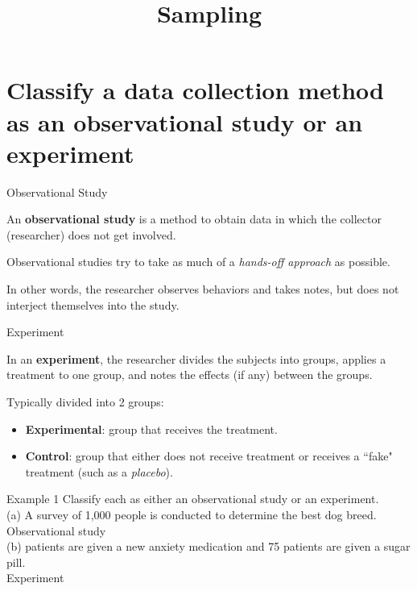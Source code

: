 \documentclass[t]{beamer}
\title{Sampling}
\author{}
\date{}
\begin{document}
\begin{frame} 
\maketitle
\end{frame}

\section{Classify a data collection method as an observational study or an experiment}

\begin{frame}{Observational Study}
\begin{tcolorbox}[colframe=green!20!black, colback = green!30!white,title=\textbf{Observational Study}]
An \textbf{observational study} is a method to obtain data in which the collector (researcher) does not get involved.
\end{tcolorbox}
\vspace{8pt} \pause

Observational studies try to take as much of a \textit{hands-off approach} as possible. \newline\\	\pause

In other words, the researcher observes behaviors and takes notes, but does not interject themselves into the study. 
\end{frame}

\begin{frame}{Experiment}
\begin{tcolorbox}[colframe=green!20!black, colback = green!30!white,title=\textbf{Experiment}]
In an \textbf{experiment}, the researcher divides the subjects into groups, applies a treatment to one group, and notes the effects (if any) between the groups.
\end{tcolorbox}
\vspace{8pt}	\pause
Typically divided into 2 groups:
\begin{itemize}
	\item \textbf{Experimental}: group that receives the treatment.	\pause
	\item \textbf{Control}: group that either does not receive treatment or receives a ``fake" treatment (such as a \textit{placebo}).
\end{itemize}
\end{frame}

\begin{frame}{Example 1}
Classify each as either an observational study or an experiment.	\newline\\	\pause
(a)	\quad A survey of 1,000 people is conducted to determine the best dog breed. \newline\\	\pause
Observational study \newline\\ \pause
(b)	 patients are given a new anxiety medication and 75 patients are given a sugar pill.	\newline\\	\pause
Experiment
\end{frame}
\end{document}
